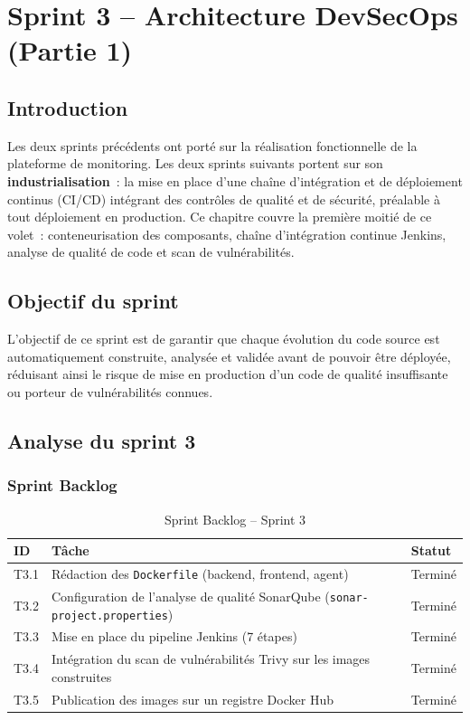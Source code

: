 \chapter{Sprint 3 -- Architecture DevSecOps (Partie 1)}
\label{chap-sprint3}

\section*{Introduction}

Les deux sprints précédents ont porté sur la réalisation fonctionnelle de la plateforme de monitoring. Les deux sprints suivants portent sur son \textbf{industrialisation}~: la mise en place d'une chaîne d'intégration et de déploiement continus (CI/CD) intégrant des contrôles de qualité et de sécurité, préalable à tout déploiement en production. Ce chapitre couvre la première moitié de ce volet~: conteneurisation des composants, chaîne d'intégration continue Jenkins, analyse de qualité de code et scan de vulnérabilités.

\section{Objectif du sprint}

L'objectif de ce sprint est de garantir que chaque évolution du code source est automatiquement construite, analysée et validée avant de pouvoir être déployée, réduisant ainsi le risque de mise en production d'un code de qualité insuffisante ou porteur de vulnérabilités connues.

\section{Analyse du sprint 3}

\subsection{Sprint Backlog}

\begin{table}[H]
\centering
\caption{Sprint Backlog -- Sprint 3}
\small
\begin{tabularx}{\linewidth}{@{}p{1.3cm}Xl@{}}
\toprule
\textbf{ID} & \textbf{Tâche} & \textbf{Statut} \\
\midrule
T3.1 & Rédaction des \texttt{Dockerfile} (backend, frontend, agent) & Terminé \\
T3.2 & Configuration de l'analyse de qualité SonarQube (\texttt{sonar-project.properties}) & Terminé \\
T3.3 & Mise en place du pipeline Jenkins (7 étapes) & Terminé \\
T3.4 & Intégration du scan de vulnérabilités Trivy sur les images construites & Terminé \\
T3.5 & Publication des images sur un registre Docker Hub & Terminé \\
\bottomrule
\end{tabularx}
\end{table}

